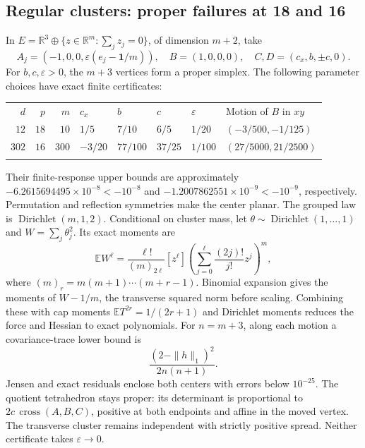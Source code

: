 \documentclass[11pt]{article}
\theoremstyle{definition}
\newcommand{\R}{\mathbb R}
\newcommand{\E}{\mathbb E}
\newcommand{\Dir}{\operatorname{Dirichlet}}
\newcommand{\toprule}{\noalign{\hrule height 0.8pt\vskip4pt}}
\newcommand{\midrule}{\noalign{\vskip3pt\hrule height 0.4pt\vskip3pt}}
\newcommand{\bottomrule}{\noalign{\vskip3pt\hrule height 0.8pt}}
\begin{document}
\subsection{Regular clusters: proper failures at 18 and 16}
In
$E=\R^3\oplus\{z\in\R^m:\sum_jz_j=0\}$, of dimension $m+2$, take
\begin{equation}\label{eq:cluster}
 A_j=(-1,0,0,\varepsilon(e_j-\mathbf1/m)),\quad
 B=(1,0,0,0),\quad C,D=(c_x,b,\pm c,0).
\end{equation}
For $b,c,\varepsilon>0$, the $m+3$ vertices form a proper simplex.
The following parameter choices have exact finite certificates:
\begin{center}\small
\begin{tabular}{@{}rrrlllll@{}}
\toprule
$d$ & $p$ & $m$ & $c_x$ & $b$ & $c$ & $\varepsilon$ & Motion of $B$ in $xy$\\
\midrule
$12$ & $18$ & $10$ & $1/5$ & $7/10$ & $6/5$ & $1/20$ & $(-3/500,-1/125)$\\
$302$ & $16$ & $300$ & $-3/20$ & $77/100$ & $37/25$ & $1/100$ & $(27/5000,21/2500)$\\
\bottomrule
\end{tabular}
\end{center}
Their finite-response upper bounds are approximately
$-6.2615694495\times10^{-8}<-10^{-8}$ and
$-1.2007862551\times10^{-9}<-10^{-9}$, respectively.
Permutation and reflection symmetries make the center planar. The grouped
law is $\Dir(m,1,2)$. Conditional on cluster mass, let
$\theta\sim\Dir(1,\ldots,1)$ and $W=\sum_j\theta_j^2$. Its exact moments are
\begin{equation}\label{eq:clustermoments}
 \E W^\ell=\frac{\ell!}{(m)_{2\ell}}[z^\ell]
       \left(\sum_{j=0}^\ell\frac{(2j)!}{j!}z^j\right)^m,
\end{equation}
where $(m)_r=m(m+1)\cdots(m+r-1)$.
Binomial expansion gives the moments of $W-1/m$, the transverse squared
norm before scaling. Combining these with cap moments $\E T^{2r}=1/(2r+1)$
and Dirichlet moments reduces the force and Hessian to exact polynomials.
For $n=m+3$, along each motion a covariance-trace lower bound is
\[
 \frac{(2-\|h\|_1)^2}{2n(n+1)}.
\]
Jensen and exact residuals enclose both centers with errors below $10^{-25}$.
The quotient tetrahedron stays proper: its determinant is proportional to
$2c\,\operatorname{cross}(A,B,C)$, positive at both endpoints and affine
in the moved vertex. The transverse cluster remains independent with
strictly positive spread. Neither certificate takes $\varepsilon\to0$.
\end{document}
